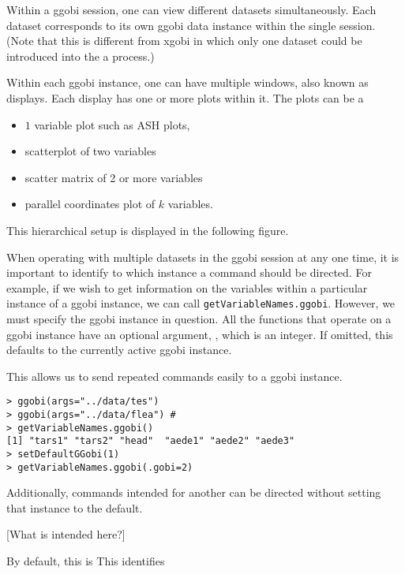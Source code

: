 \documentclass{article}
\def\SFunction#1{{\texttt{\red #1}}}
\begin{document}
Within a ggobi session, one can view different datasets
simultaneously. Each dataset corresponds to its own ggobi data
instance within the single session.  (Note that this is different from
xgobi in which only one dataset could be introduced into the a
process.)

Within each ggobi instance, one can have multiple windows, also known
as displays.  Each display has one or more plots within it.  The plots
can be a
\begin{itemize}
\item $1$ variable plot
such as ASH plots,
\item  scatterplot of two variables
\item scatter matrix of 2 or more variables
\item parallel coordinates plot of $k$ variables.
\end{itemize}

This hierarchical setup is displayed in the following
figure.
\begin{center}
\end{center}

When operating with multiple datasets in the ggobi session at any one
time, it is important to identify to which instance a command should
be directed.  For example, if we wish to get information on the
variables within a particular instance of a ggobi instance, we can
call \SFunction{getVariableNames.ggobi}. However, we must
specify the ggobi instance in question. All the functions
that operate on a ggobi instance have an optional argument,
, which is an integer.
If omitted, this defaults to the currently active
ggobi instance.

This allows us to send repeated commands easily to a ggobi instance.
\begin{verbatim}
> ggobi(args="../data/tes") 
> ggobi(args="../data/flea") #
> getVariableNames.ggobi()
[1] "tars1" "tars2" "head"  "aede1" "aede2" "aede3"
> setDefaultGGobi(1)
> getVariableNames.ggobi(.gobi=2)
\end{verbatim}
Additionally, commands intended for another can be directed without
setting that instance to the default.

[What is intended here?]

By default, this is 
This identifies 
\end{document}
